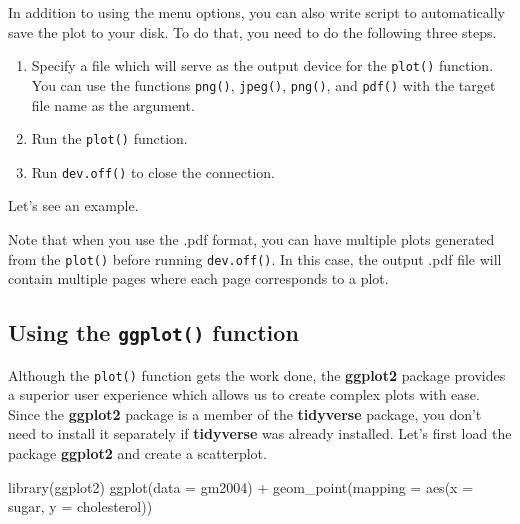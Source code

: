 \documentclass[
]{book}
\newenvironment{Shaded}{\begin{snugshade}}{\end{snugshade}}
\newcommand{\AttributeTok}[1]{\textcolor[rgb]{0.77,0.63,0.00}{#1}}
\newcommand{\FunctionTok}[1]{\textcolor[rgb]{0.00,0.00,0.00}{#1}}
\newcommand{\NormalTok}[1]{#1}
\newcommand{\SpecialCharTok}[1]{\textcolor[rgb]{0.00,0.00,0.00}{#1}}
\newcommand{\StringTok}[1]{\textcolor[rgb]{0.31,0.60,0.02}{#1}}
\providecommand{\tightlist}{%
  \setlength{\itemsep}{0pt}\setlength{\parskip}{0pt}}
\begin{document}
In addition to using the menu options, you can also write script to automatically save the plot to your disk. To do that, you need to do the following three steps.

\begin{enumerate}
\def\labelenumi{\arabic{enumi}.}
\tightlist
\item
  Specify a file which will serve as the output device for the \texttt{plot()} function. You can use the functions \texttt{png()}, \texttt{jpeg()}, \texttt{png()}, and \texttt{pdf()} with the target file name as the argument.
\item
  Run the \texttt{plot()} function.
\item
  Run \texttt{dev.off()} to close the connection.
\end{enumerate}

Let's see an example.

\begin{Shaded}
\end{Shaded}

Note that when you use the .pdf format, you can have multiple plots generated from the \texttt{plot()} before running \texttt{dev.off()}. In this case, the output .pdf file will contain multiple pages where each page corresponds to a plot.

\hypertarget{point}{%
\subsection{\texorpdfstring{Using the \texttt{ggplot()} function}{Using the ggplot() function}}\label{point}}

Although the \texttt{plot()} function gets the work done, the \textbf{ggplot2} package provides a superior user experience which allows us to create complex plots with ease. Since the \textbf{ggplot2} package is a member of the \textbf{tidyverse} package, you don't need to install it separately if \textbf{tidyverse} was already installed. Let's first load the package \textbf{ggplot2} and create a scatterplot.

\begin{Shaded}
\begin{Highlighting}[]
\FunctionTok{library}\NormalTok{(ggplot2)}
\FunctionTok{ggplot}\NormalTok{(}\AttributeTok{data =}\NormalTok{ gm2004) }\SpecialCharTok{+} 
  \FunctionTok{geom\_point}\NormalTok{(}\AttributeTok{mapping =} \FunctionTok{aes}\NormalTok{(}\AttributeTok{x =}\NormalTok{ sugar, }
                           \AttributeTok{y =}\NormalTok{ cholesterol))}
\end{Highlighting}
\end{Shaded}
\end{document}
